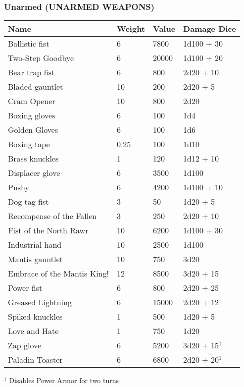 \subsubsection{Unarmed (UNARMED WEAPONS)}
\begin{longtable}{|p{6cm}|p{4cm}|p{4cm}|p{4cm}|}
\hline
\bfseries Name& \bfseries Weight & \bfseries Value & \bfseries Damage Dice  \\ 
\hline
\endhead
Ballistic fist & 6 & 7800 & 1d100 + 30 \\
Two-Step Goodbye & 6 & 20000 & 1d100 + 20 \\
Bear trap fist  & 6 & 800 & 2d20 + 10 \\
Bladed gauntlet & 10 & 200 & 2d20 + 5 \\
Cram Opener & 10 & 800 & 2d20 \\
Boxing gloves & 6 & 100 & 1d4 \\
Golden Gloves & 6 & 100 & 1d6\\
Boxing tape & 0.25 & 100 & 1d10 \\
Brass knuckles & 1 & 120 & 1d12 + 10 \\
Displacer glove & 6 & 3500 & 1d100 \\
Pushy & 6 & 4200 & 1d100 + 10 \\
Dog tag fist & 3 & 50 & 1d20 + 5\\
Recompense of the Fallen & 3 & 250 & 2d20 + 10 \\
Fist of the North Rawr & 10 & 6200 & 1d100 + 30 \\
Industrial hand  & 10 & 2500 & 1d100\\
Mantis gauntlet & 10 & 750 & 3d20 \\
Embrace of the Mantis King!  & 12 & 8500 & 3d20 + 15 \\
Power fist  & 6 & 800 & 2d20 + 25 \\
Greased Lightning & 6 & 15000 & 2d20 + 12 \\
Spiked knuckles & 1 & 500 & 1d20 + 5 \\
Love and Hate & 1 & 750 & 1d20 \\
Zap glove & 6 & 5200 & 3d20 + 15$^1$ \\
Paladin Toaster & 6 & 6800 & 2d20 + 20$^1$ \\
\end{longtable}
$^1$ Disables Power Armor for two turns

